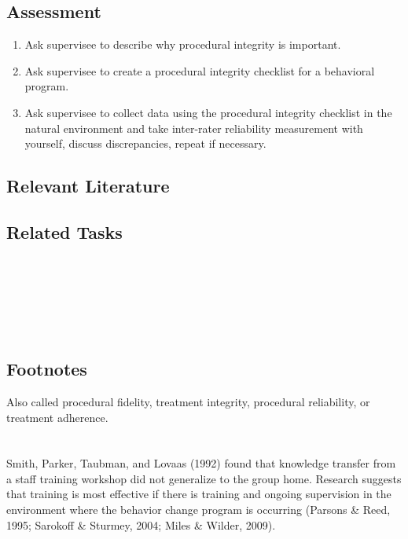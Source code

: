 \subsection{Assessment}
\begin{enumerate}
\item Ask supervisee to describe why procedural integrity is important.
\item Ask supervisee to create a procedural integrity checklist for a behavioral program.
\item Ask supervisee to collect data using the procedural integrity checklist in the natural environment and take inter-rater reliability measurement with yourself, discuss discrepancies, repeat if necessary.
\end{enumerate}
%
\subsection{Relevant Literature}
\begin{refsection}
\nocite{test,alang2017police,clayton2018black}
\printbibliography[heading=none]
\end{refsection} 
%                         
\subsection{Related Tasks}
\fourfOne{}\\
\fourhThree{}\\
\fourhFour{}\\
\fourkThree{}\\
\fourkFour{}\\
%
\subsection{Footnotes}
Also called procedural fidelity, treatment integrity, procedural reliability, or treatment adherence.
%
%
%
%
%
%
\section{\fourkSix{}}
Smith, Parker, Taubman, and Lovaas (1992) found that knowledge transfer from a staff training workshop did not generalize to the group home.  Research suggests that training is most effective if there is training and ongoing supervision in the environment where the behavior change program is occurring (Parsons \& Reed, 1995; Sarokoff \& Sturmey, 2004; Miles \& Wilder, 2009).

